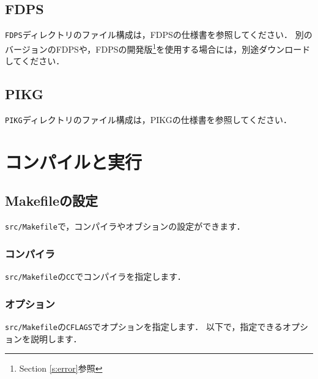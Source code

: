 \documentclass[12pt,a4paper,dvipdfmx]{jsarticle}
\newcommand{\ourcodeR}{GPLUM-2.4\xspace}
\begin{document}
\subsection{FDPS}
\texttt{FDPS}ディレクトリのファイル構成は，FDPSの仕様書を参照してください．
別のバージョンのFDPSや，FDPSの開発版\footnote{Section \ref{s:error}参照}を使用する場合には，別途ダウンロードしてください．

\subsection{PIKG}
\texttt{PIKG}ディレクトリのファイル構成は，PIKGの仕様書を参照してください．



\section{コンパイルと実行}

\subsection{Makefileの設定}

\texttt{src/Makefile}で，コンパイラやオブションの設定ができます．

\subsubsection{コンパイラ}
\texttt{src/Makefile}の\texttt{CC}でコンパイラを指定します．

\subsubsection{オプション}
\texttt{src/Makefile}の\texttt{CFLAGS}でオプションを指定します．
以下で，指定できるオプションを説明します．
\end{document}
